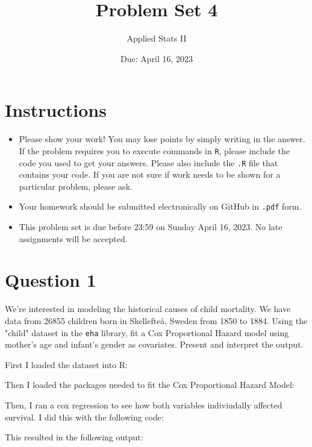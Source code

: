 \documentclass[12pt,letterpaper]{article}
\title{Problem Set 4}
\date{Due: April 16, 2023}
\author{Applied Stats II}
\begin{document}
	\maketitle
	\section*{Instructions}
	\begin{itemize}
	\item Please show your work! You may lose points by simply writing in the answer. If the problem requires you to execute commands in \texttt{R}, please include the code you used to get your answers. Please also include the \texttt{.R} file that contains your code. If you are not sure if work needs to be shown for a particular problem, please ask.
	\item Your homework should be submitted electronically on GitHub in \texttt{.pdf} form.
	\item This problem set is due before 23:59 on Sunday April 16, 2023. No late assignments will be accepted.

	\end{itemize}

	\vspace{.25cm}
\section*{Question 1}
\vspace{.25cm}
\noindent We're interested in modeling the historical causes of child mortality. We have data from 26855 children born in Skellefteå, Sweden from 1850 to 1884. Using the "child" dataset in the \texttt{eha} library, fit a Cox Proportional Hazard model using mother's age and infant's gender as covariates. Present and interpret the output.


First I loaded the dataset into R:
 	

Then I loaded the packages needed to fit the Cox Proportional Hazard Model:
 

Then, I ran a cox regression to see how both variables indiviudally affected survival. I did this with the following code:
 

This resulted in the following output:
 
\end{document}
